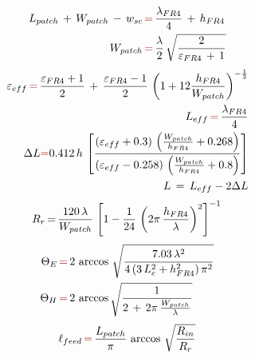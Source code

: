\documentclass[12pt,a4paper]{article}
\begin{document}
{\begin{multicols}{2}
\begin{table}[h]
\end{table}

\begin{equation}
	\begin{aligned}L_{patch}\,+\,W_{patch}\,-\,w_{sc}\,&{\color{Mahogany}=}\,\frac{\lambda_{FR4}}{4}\,+\,h_{FR4}\\
		W_{patch}\,&{\color{Mahogany}=}\,\frac{\lambda}{2}\,\sqrt{\frac{2}{\varepsilon_{FR4}\,+\,1}}\\
	\end{aligned}
\label{eq:patch size}
\end{equation}
\begin{equation}
	\begin{aligned}
		\varepsilon_{eff}\,{\color{Mahogany}=}\,\frac{\varepsilon_{FR4}+1}{2}\,+\,\frac{\varepsilon_{FR4}-1}{2}\,\left(1+12\frac{h_{FR4}}{W_{patch}}\right)^{-\frac{1}{2}}\\
		L_{eff}\,{\color{Mahogany}=}\,\frac{\lambda_{FR4}}{4}\\
		\Delta L{\color{Mahogany}=}0.412\,h\,\left[\frac{(\varepsilon_{eff}+0.3)\,\left(\frac{W_{patch}}{h_{FR4}}+0.268\right)}{(\varepsilon_{eff}-0.258)\,\left(\frac{W_{patch}}{h_{FR4}}+0.8\right)}\right]\\
		L\,=\,L_{eff}-2\Delta L
	\end{aligned}
\label{eq:patch effective}
\end{equation}
\begin{equation}
R_r\,{=}\,\frac{120\,\lambda}{W_{patch}}\,\left[1-\frac{1}{24}\,\left(2\pi\,\frac{h_{FR4}}{\lambda}\right)^{2}\right]^{-1}\\
\label{eq:radiation resistance}
\end{equation}
\begin{equation}
	\begin{aligned}
		\Theta_E\,&{\color{Mahogany}=}\,2\,\arccos\,\sqrt{\frac{7.03\,\lambda^2}{4\,(3\,L_e^2+h_{FR4}^2)\,\pi^2}}\\
		\Theta_H\,&{\color{Mahogany}=}\,2\,\arccos\sqrt{\frac{1}{2\,+\,2\pi\,\frac{W_{patch}}{\lambda}}}\\
	\end{aligned}
\label{eq:beamwidth EH cuts}
\end{equation}
\begin{equation}
	\ell_{feed}\,{\color{Mahogany}=}\,\frac{L_{patch}}{\pi}\,\arccos\,\sqrt{\frac{R_{in}}{R_r}}
	\label{eq:feed length coordinate}
\end{equation}


\end{multicols}}
\end{document}
